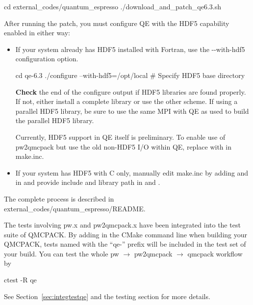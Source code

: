 \begin{shade}
cd external_codes/quantum_espresso
./download_and_patch_qe6.3.sh
\end{shade}
After running the patch, you must configure QE with
the HDF5 capability enabled in either way:
\begin{itemize}
\item If your system already has HDF5 installed with Fortran, use the -{}-with-hdf5 configuration option.

\begin{shade}
cd qe-6.3
./configure --with-hdf5=/opt/local   # Specify HDF5 base directory
\end{shade}
   {\bf Check} the end of the configure output if HDF5 libraries are found properly.
   If not, either install a complete library or use the other scheme. If using a parallel HDF5 library, be sure to use
   the same MPI with QE as used to build the parallel HDF5 library.

   Currently, HDF5 support in QE itself is preliminary. To enable use of pw2qmcpack
   but use the old non-HDF5 I/O within QE, replace  with  in make.inc.
\item If your system has HDF5 with C only, manually edit make.inc by adding  and 
   in  and provide include and library path in  and .
\end{itemize}

The complete process is described in external\_codes/quantum\_espresso/README.

The tests involving pw.x and pw2qmcpack.x have been integrated into the test suite of QMCPACK.
By adding  in the CMake command line when building your QMCPACK,
tests named with the ``qe-'' prefix will be included in the test set of your build.
You can test the whole pw $\to$ pw2qmcpack $\to$ qmcpack workflow by

\begin{shade}
ctest -R qe
\end{shade}
See Section~\ref{sec:integtestqe} and the testing section for more details.

